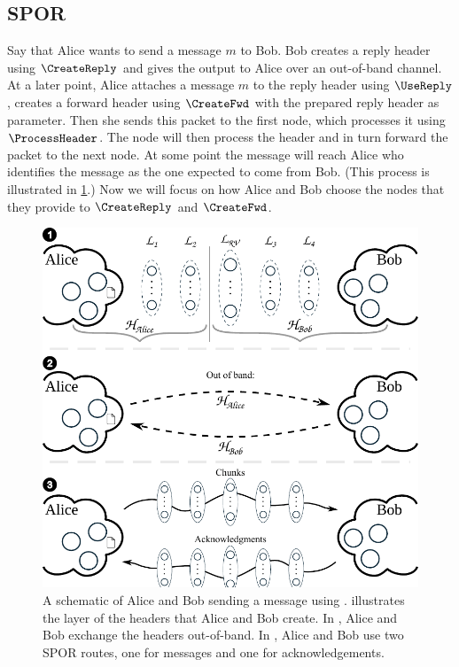 

\subsection{\Acf*{SPOR}}%
\label{SPOR}%
\label{sec:SPOR}%
\label{sec:message_passing}%

Say that Alice wants to send a message \(m\) to Bob.
Bob creates a reply header using \(\CreateReply\) and gives the output to Alice 
over an out-of-band channel.
At a later point, Alice attaches a message \(m\) to the reply header using 
\(\UseReply\), creates a forward header using \(\CreateFwd\) with the prepared 
reply header as parameter.
 Then she sends this packet to the first node, which processes it using 
\(\ProcessHeader\).
The node will then process the header and in turn forward the packet to the 
next node.
At some point the message will reach Alice who identifies the message as the 
one expected to come from Bob.
(This process is illustrated in \cref{fig:file-transfer}.)
Now we will focus on how Alice and Bob choose the nodes that they provide to 
\(\CreateReply\) and \(\CreateFwd\).

\begin{figure}
  \includegraphics[width=\linewidth]{figures/file_transfer_v2.pdf}
  \caption{\label{fig:file-transfer}%
    A schematic of Alice and Bob sending a message using \name.
     illustrates the layer of the headers that Alice and Bob create.
    In , Alice and Bob exchange the headers out-of-band.
    In , Alice and Bob use two \ac{SPOR} routes, one for messages and 
    one for acknowledgements.
  }
\end{figure}

